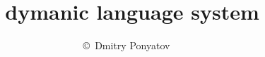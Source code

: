 





\title{\bi\ dymanic language system}
\author{\copyright\ Dmitry Ponyatov }


\maketitle
\tableofcontents



